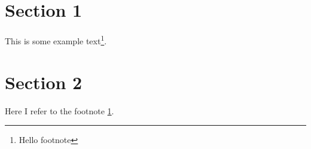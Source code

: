 \documentclass{article}
\begin{document}
	\section{Section 1}
	This is some example text\footnote{\label{myfootnote}Hello footnote}.
	\section{Section 2}
	Here I refer to the footnote \ref{myfootnote}.
	
\end{document}
